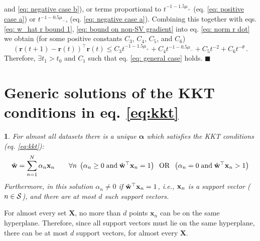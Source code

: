 \documentclass[twoside,11pt,english]{article}
\newtheorem{lem}[thm]{\protect\lemmaname}
\providecommand{\lemmaname}{Lemma}
\providecommand{\lemmaname}{Lemma}
\begin{document}
\begin{enumerate}
and \ref{eq: negative case b}), or terms proportional to $t^{-1-1.5\mu_{+}}$
(eq. \ref{eq: positive case a}) or $t^{-1-0.5\mu_{-}}$, (eq. \ref{eq: negative case a}).
Combining this together with eqs. \ref{eq: w_hat r bound 1}, \ref{eq: bound on non-SV gradient}
into eq. \ref{eq: norm r dot} we obtain (for some positive constants
$C_{3}$, $C_{4}$, $C_{5}$, and $C_{6}$) 
\[
\left(\mathbf{r}\left(t+1\right)-\mathbf{r}\left(t\right)\right)^{\top}\mathbf{r}\left(t\right)\leq C_{3}t^{-1-1.5\mu_{+}}+C_{4}t^{-1-0.5\mu_{-}}+C_{5}t^{-2}+C_{6}t^{-\theta}\,.
\]
Therefore, $\exists t_{1}>t_{0}$ and $C_{1}$ such that eq. \ref{eq: general case}
holds. $\blacksquare$
\end{enumerate}


\section{Generic solutions of the KKT conditions in eq. \ref{eq:kkt} \label{sec:alpha}}
\begin{lem}
\label{lem: alpha} For almost all datasets there is a unique $\boldsymbol{\alpha}$
which satisfies the KKT conditions (eq. \ref{eq:kkt}): 
\[
\hat{\mathbf{w}}=\sum_{n=1}^{N}\alpha_{n}\mathbf{x}_{n}\quad\quad\forall n\;\left(\alpha_{n}\geq0\;\textrm{and}\;\hat{\mathbf{w}}^{\top}\mathbf{x}_{n}=1\right)\;\;\textrm{OR}\;\;\left(\alpha_{n}=0\;\textrm{and}\;\hat{\mathbf{w}}^{\top}\mathbf{x}_{n}>1\right)
\]
Furthermore, in this solution $\alpha_{n}\neq0$ if $\hat{\mathbf{w}}^{\top}\mathbf{x}_{n}=1$,
{\em{i.e.}}, $\mathbf{x}_{n}$ is a support vector ($n\in\mathcal{S}$), and
there are at most $d$ such support vectors. 
\end{lem}

For almost every set $\mathbf{X}$, no more than $d$ points $\mathbf{x}_{n}$
can be on the same hyperplane. Therefore, since all support vectors
must lie on the same hyperplane, there can be at most $d$ support
vectors, for almost every $\mathbf{X}$.
\end{document}
